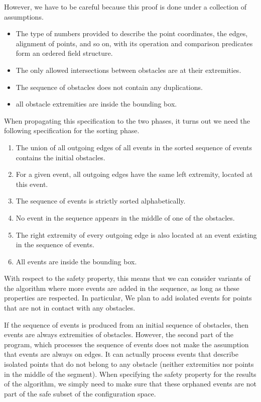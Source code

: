 \documentclass[a4paper, USenglish, cleveref, autoref, thm-restate]{lipics-v2021}
\begin{document}
However, we have to be careful because this proof is done under a
collection of assumptions.
\begin{itemize}
\item The type of numbers provided to describe the point coordinates,
  the edges, alignment of points, and so on, with its operation and
  comparison predicates form an ordered field structure.
\item The only allowed intersections between obstacles are at their
  extremities.
\item The sequence of obstacles does not contain any duplications.
\item all obstacle extremities are inside the
bounding box.
\end{itemize}
When propagating this specification to the two phases, it turns out we
need the following specification for the sorting phase.
\begin{enumerate}
\item The union of all outgoing edges of all events in the sorted
  sequence of events contains the initial obstacles.
\item For a given event, all outgoing edges have the same left
  extremity, located at this event.
\item The sequence of events is strictly sorted alphabetically.
\item No event in the sequence appears in the middle of one of the
  obstacles.
\item The right extremity of every outgoing edge is also located at an
  event existing in the sequence of events.
\item All events are inside the bounding box.
\end{enumerate}
With respect to the safety property, this means that we can consider
variants of the algorithm where more events are added in the sequence,
as long as these properties are respected.  In particular,
We plan to add isolated events for points that are not in contact with
any obstacles.

If the sequence of events is produced from an initial sequence of
obstacles, then events are always extremities of obstacles.  However,
the second part of the program, which processes the sequence of events
does not make the assumption that events are always on edges.  It can
actually process events that describe isolated points that do not
belong to any obstacle (neither extremities nor points in the middle
of the segment).  When specifying the safety
property for the results of the algorithm, we simply need to make sure
that these orphaned events are not part of the safe subset of the
configuration space.
\end{document}
